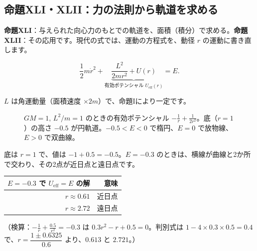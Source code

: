 \documentclass[a4paper,11pt,openany]{ltjsbook}
\begin{document}
\subsection{命題XLI・XLII：力の法則から軌道を求める}

\textbf{命題XLI}：与えられた向心力のもとでの軌道を、面積（積分）で求める。\textbf{命題XLII}：その応用です。現代の式では、運動の方程式を、動径 $r$ の運動に書き直します。

\[
\frac12m\dot r^2+\underbrace{\frac{L^2}{2mr^2}+U(r)}_{\text{有効ポテンシャル }U_\text{eff}(r)}=E.
\]

$L$ は角運動量（面積速度 $\times2m$）で、命題Iにより一定です。

\begin{figure}[htbp]
\centering
{}
\caption{$GM=1,\,L^2/m=1$ のときの有効ポテンシャル $-\frac1r+\frac1{2r^2}$。底（$r=1$）の高さ $-0.5$ が円軌道。$-0.5<E<0$ で楕円、$E=0$ で放物線、$E>0$ で双曲線。}
\end{figure}

底は $r=1$ で、値は $-1+0.5=-0.5$。$E=-0.3$ のときは、横線が曲線と2か所で交わり、その2点が近日点と遠日点です。

\begin{center}
\begin{tabular}{rr}
\toprule
$E=-0.3$ で $U_\text{eff}=E$ の解 & 意味\\
\midrule
$r\approx0.61$ & 近日点\\
$r\approx2.72$ & 遠日点\\
\bottomrule
\end{tabular}
\end{center}

（検算：$-\frac1r+\frac{0.5}{r^2}=-0.3$ は $0.3r^2-r+0.5=0$。判別式は $1-4\times0.3\times0.5=0.4$ で、$r=\dfrac{1\pm0.6325}{0.6}$ より、$0.613$ と $2.721$。）
\end{document}

